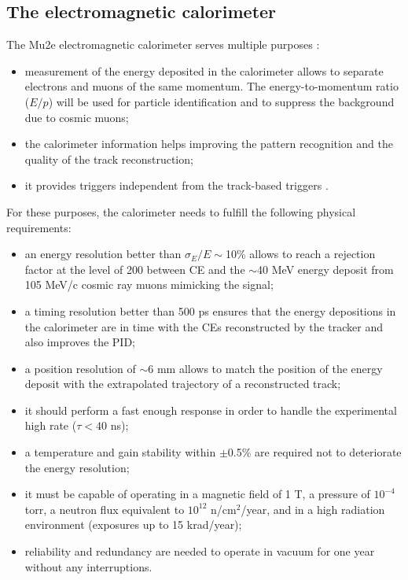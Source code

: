 \subsection{The electromagnetic calorimeter}\label{calorimeter}
The Mu2e electromagnetic calorimeter serves multiple purposes \cite{em4}:
\begin{itemize}
    \item {} measurement of the energy deposited in the calorimeter 
    allows to separate electrons and muons of the same momentum. 
    The energy-to-momentum ratio ($E/p$) will be used for particle 
    identification and to suppress the background due to cosmic muons;
  \item the calorimeter information 
    helps improving the pattern recognition and 
    the quality of the track reconstruction;
    \item it provides triggers independent from the track-based triggers \cite{em6}. 
\end{itemize} 
For these purposes, the calorimeter needs to fulfill the following physical requirements:
\begin{itemize}
    \item an energy resolution better than $\sigma_E/E \sim$10\% allows
     to reach a rejection factor at the level of 200 between CE
    and the $\sim$40 MeV energy deposit from 105 MeV/c cosmic ray muons mimicking the signal;
    \item a timing resolution better than 500 ps ensures that
    the energy depositions in the calorimeter are in time with
    the CEs reconstructed by the tracker and
    also improves the PID;
    \item a position resolution of $\sim$6 mm allows 
    to match the position of the energy deposit with the 
    extrapolated trajectory of a reconstructed track;
    \item it should perform a fast enough 
      response in order to handle the experimental high rate ($\tau < 40$ ns);
    \item a temperature and gain stability within $\pm$0.5\% 
    are required not to deteriorate the energy resolution;
    \item it must be capable of operating in 
    a magnetic field of 1 T, a pressure of \(10^{-4}\) torr, a 
    neutron flux equivalent to \(10^{12}\) n/cm\(^2\)/year, 
    and in a high radiation environment (exposures up to 15 krad/year);
    \item reliability and redundancy are needed to operate in vacuum for one
    year without any interruptions.
\end{itemize}


